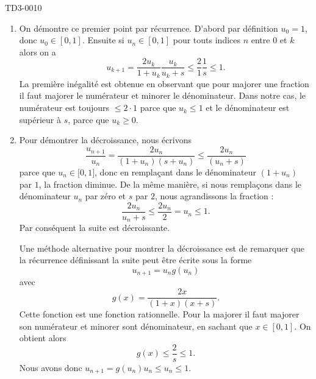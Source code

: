 


\begin{corrige}{TD3-0010}
  

  \begin{enumerate}
  \item 
      On démontre ce premier point par récurrence. D'abord par définition $u_0=1$, donc $u_0\in[0,1]$. Ensuite si $u_n\in[0,1]$ pour touts indices $n$ entre $0$ et $k$ alors on a 
            \[
            u_{k+1}=\frac{2u_k}{1+u_k}\frac{u_k}{u_k+s}\leq\frac{2}{1}\frac{1}{s}\leq 1.
            \] 
            La première inégalité est obtenue en observant que pour majorer une fraction il faut majorer le numérateur et minorer le dénominateur. Dans notre cas, le numérateur est toujours $\leq 2 \cdot 1$ parce que $u_k\leq 1$ et le dénominateur est supérieur à $s$, parce que $u_k\geq 0$.

    \item 
        
        Pour démontrer la décroissance, nous écrivons
        \begin{equation}
            \frac{ u_{n+1} }{ u_n }=\frac{ 2u_n }{ (1+u_n)(s+u_n) }\leq \frac{ 2u_n }{ (u_n+s) }
        \end{equation}
        parce que \( u_n\in\mathopen[ 0 , 1 \mathclose]\), donc en remplaçant dans le dénominateur \( (1+u_n)\) par \( 1\), la fraction diminue. De la même manière, si nous remplaçons dans le dénominateur \( u_n\) par zéro et \( s\) par \( 2\), nous agrandissons la fraction :
        \begin{equation}
            \frac{ 2u_n }{ u_n+s }\leq \frac{ 2u_n }{ 2 }=u_n\leq 1.
        \end{equation}
        Par conséquent la suite est décroissante.
        
        Une méthode alternative pour montrer la décroissance est de remarquer que la récurrence définissant la suite peut être écrite sous la forme
        \begin{equation}
            u_{n+1}=u_ng(u_n)
        \end{equation}
        avec
        \begin{equation}
            g(x)=\frac{2x}{(1+x)(x+s)}.
        \end{equation}
        Cette fonction est une fonction rationnelle. Pour la majorer il faut majorer son numérateur et minorer sont dénominateur, en sachant que $x\in[0,1]$. On obtient alors 
        \begin{equation}
            g(x)\leq \frac{2}{s}\leq 1.
        \end{equation}
        Nous avons donc \( u_{n+1}=g(u_n)u_n\leq u_n\leq 1\).


\end{enumerate}
\end{corrige}
